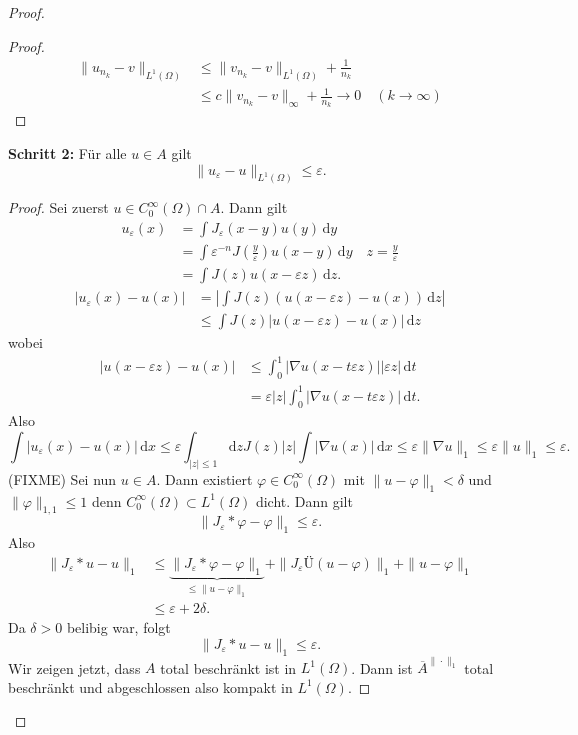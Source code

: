 \documentclass[
paper=a4,
bibtotocnumbered,
liststotocnumbered,
tablecaptionabove,
pointlessnumbers,
twoside,
openright,
10pt
]
{report}
\let\phi\varphi
\theoremstyle{definition}
\numberwithin{equation}{chapter}
\begin{document}
\begin{proof}
\begin{proof}
\begin{align*}
 \|u_{n_k}-v\|_{L^1(\Omega)} &\le \| v_{n_k}-v\|_{L^1(\Omega)} + \frac{1}{n_k}\\
 &\le c\| v_{n_k}-v\|_\infty + \frac{1}{n_k} \to 0 \quad (k\to \infty)
\end{align*}
\end{proof}
\textbf{Schritt 2:} Für alle $u\in A$ gilt
\begin{equation}
 \|u_\varepsilon -u\|_{L^1(\Omega)} \le \varepsilon.
\end{equation}
\begin{proof}
Sei zuerst $u\in C_0^\infty(\Omega) \cap A$. Dann gilt
\begin{align*}
 u_\varepsilon(x) &= \int J_\varepsilon(x-y) u(y) \, \mathrm dy \\
 &= \int \varepsilon^{-n} J(\frac{y}{\varepsilon}) u(x-y)\, \mathrm dy \quad z=\frac{y}{\varepsilon}\\
 &= \int J(z) u(x-\varepsilon z) \, \mathrm dz.
\end{align*}
\begin{align*}
 |u_\varepsilon(x) -u(x)| &= | \int J(z) ( u(x-\varepsilon z) - u(x)) \, \mathrm dz| \\
 &\le \int J(z) |u(x- \varepsilon z) - u(x)|\, \mathrm dz
\end{align*}
wobei
\begin{align*}
 |u(x-\varepsilon z) - u(x) | &\le \int_0^1 |\nabla u(x-t\varepsilon z) | |\varepsilon z|\, \mathrm dt\\
 &= \varepsilon |z| \int_0^1 |\nabla u(x-t\varepsilon z) |\, \mathrm dt.
\end{align*}
Also
\begin{equation}
 \int | u_\varepsilon(x) - u(x)|\, \mathrm dx\le \varepsilon \int_{|z|\le 1} \mathrm dz J(z) |z| \int |\nabla u(x)|\, \mathrm dx \le \varepsilon \| \nabla u\|_1\le \varepsilon \| u\|_1\le \varepsilon.
\end{equation}
(FIXME)
Sei nun $u\in A$. Dann existiert $\phi \in C_0^\infty(\Omega)$ mit $\|u-\phi\|_1 <\delta$ und $\| \phi\|_{1,1} \le 1$ denn $C_0^\infty(\Omega) \subset L^1(\Omega)$ dicht. Dann gilt
\begin{equation}
 \|J_\varepsilon* \phi - \phi \|_1 \le \varepsilon.
\end{equation}
Also 
\begin{align*}
 \| J_\varepsilon*u -u\|_1 &\le \underbrace{\|J_\varepsilon * \phi - \phi\|_1}_{\le \|u-\phi\|_1} + \| J_\varepsilon Ü (u-\phi)\|_1 + \| u-\phi\|_1\\
 &\le \varepsilon + 2\delta.
\end{align*}
Da $\delta >0$ belibig war, folgt
\begin{equation}
 \| J_\varepsilon * u - u \|_1 \le \varepsilon.
\end{equation}
Wir zeigen jetzt, dass $A$ total beschränkt ist in $L^1(\Omega)$. Dann ist $\overline{A}^{\|\cdot\|_1}$ total beschränkt und abgeschlossen also kompakt in $L^1(\Omega)$.


\end{proof}
\end{proof}
\end{document}
